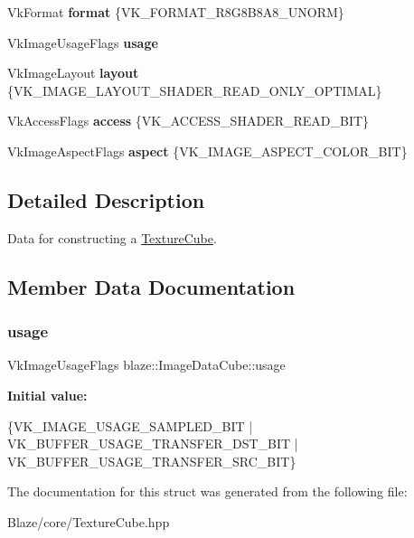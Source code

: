 \begin{DoxyCompactItemize}
Vk\+Format {\bfseries format} \{V\+K\+\_\+\+F\+O\+R\+M\+A\+T\+\_\+\+R8\+G8\+B8\+A8\+\_\+\+U\+N\+O\+RM\}
\item 
Vk\+Image\+Usage\+Flags {\bfseries usage}
\item 
\mbox{\label{structblaze_1_1ImageDataCube_a21266c35c3a86dd118ee7042272ff12c}} 
Vk\+Image\+Layout {\bfseries layout} \{V\+K\+\_\+\+I\+M\+A\+G\+E\+\_\+\+L\+A\+Y\+O\+U\+T\+\_\+\+S\+H\+A\+D\+E\+R\+\_\+\+R\+E\+A\+D\+\_\+\+O\+N\+L\+Y\+\_\+\+O\+P\+T\+I\+M\+AL\}
\item 
\mbox{\label{structblaze_1_1ImageDataCube_a8eeb8f061de7ddec298a4d21106f2603}} 
Vk\+Access\+Flags {\bfseries access} \{V\+K\+\_\+\+A\+C\+C\+E\+S\+S\+\_\+\+S\+H\+A\+D\+E\+R\+\_\+\+R\+E\+A\+D\+\_\+\+B\+IT\}
\item 
\mbox{\label{structblaze_1_1ImageDataCube_af6296fa56876bdb6ec95382ab5b91b4d}} 
Vk\+Image\+Aspect\+Flags {\bfseries aspect} \{V\+K\+\_\+\+I\+M\+A\+G\+E\+\_\+\+A\+S\+P\+E\+C\+T\+\_\+\+C\+O\+L\+O\+R\+\_\+\+B\+IT\}
\end{DoxyCompactItemize}


\subsection{Detailed Description}
Data for constructing a \hyperlink{classblaze_1_1TextureCube}{Texture\+Cube}. 

\subsection{Member Data Documentation}
\mbox{\label{structblaze_1_1ImageDataCube_ac09d849a4290992ce07df52e8beb3820}} 
\subsubsection{\texorpdfstring{usage}{usage}}
{\footnotesize\ttfamily Vk\+Image\+Usage\+Flags blaze\+::\+Image\+Data\+Cube\+::usage}

{\bfseries Initial value\+:}
\begin{DoxyCode}
\{VK\_IMAGE\_USAGE\_SAMPLED\_BIT | VK\_BUFFER\_USAGE\_TRANSFER\_DST\_BIT |
                            VK\_BUFFER\_USAGE\_TRANSFER\_SRC\_BIT\}
\end{DoxyCode}


The documentation for this struct was generated from the following file\+:\begin{DoxyCompactItemize}
\item 
Blaze/core/Texture\+Cube.\+hpp\end{DoxyCompactItemize}
